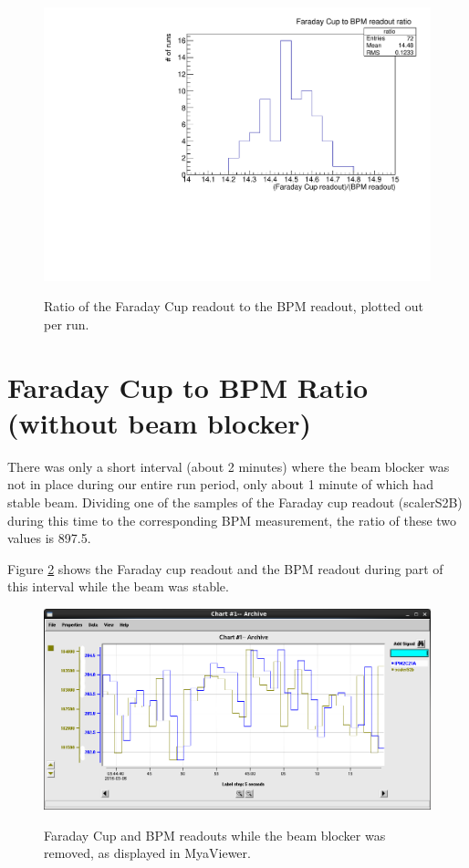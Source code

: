 \documentclass[11pt]{article}
\begin{document}
\begin{figure}[htbp] 
\begin{center}
\includegraphics[width =  .9\textwidth]{figures/beam_blocker_ratio.pdf}
\label{fig:beam_blocker_ratio}
\caption{Ratio of the Faraday Cup readout to the BPM readout, plotted out per run.} 

\end{center}
\end{figure}


\section{Faraday Cup to BPM Ratio (without beam blocker)}

There was only a short interval (about 2 minutes) where the beam blocker was not in place during our entire run period, only about 1 minute of which had stable beam.  Dividing one of the samples of the Faraday cup readout (scalerS2B) during this time to the corresponding BPM measurement, the ratio of these two values is 897.5.

Figure \ref{fig:no_beam_blocker} shows the Faraday cup readout and the BPM readout during part of this interval while the beam was stable.

\begin{figure}[htbp] 
\begin{center}
\includegraphics[width =  .9\textwidth]{figures/no_beam_blocker.png}
\label{fig:no_beam_blocker}
\caption{Faraday Cup and BPM readouts while the beam blocker was removed, as displayed in MyaViewer.} 

\end{center}
\end{figure}
  
\end{document}
